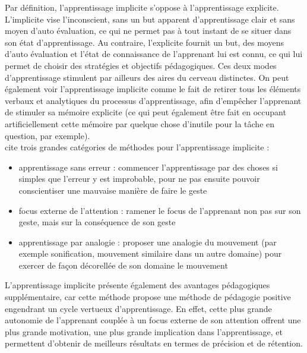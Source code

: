 Par définition, l'apprentissage implicite s'oppose à l'apprentissage explicite. 
L'implicite vise l'inconscient, sans un but apparent d'apprentissage clair et sans moyen d'auto évaluation, ce qui ne permet pas à tout instant de se situer dans son état d'apprentissage. 
Au contraire, l'explicite fournit un but, des moyens d'auto évaluation et l'état de connaissance de l'apprenant lui est connu, ce qui lui permet de choisir des stratégies et objectifs pédagogiques.
Ces deux modes d'apprentissage stimulent par ailleurs des aires du cerveau distinctes. \cite{ImplicitMotorLearning.Fang+}
On peut également voir l'apprentissage implicite comme le fait de retirer tous les éléments verbaux et analytiques du processus d'apprentissage, afin d'empêcher l'apprenant de stimuler sa mémoire explicite \cite{SoYouLearnImplicitly.Poolton+}
(ce qui peut également être fait en occupant artificiellement cette mémoire par quelque chose d'inutile pour la tâche en question, par exemple). \\

\cite{SoYouLearnImplicitly.Poolton+} cite trois grandes catégories de méthodes pour l'apprentissage implicite : 
\begin{itemize}
    \item apprentissage sans erreur : commencer l'apprentissage par des choses si simples que l'erreur y est improbable, pour ne pas ensuite pouvoir conscientiser une mauvaise manière de faire le geste
    \item focus externe de l'attention : ramener le focus de l'apprenant non pas sur son geste, mais sur la conséquence de son geste
    \item apprentissage par analogie : proposer une analogie du mouvement (par exemple sonification, mouvement similaire dans un autre domaine) pour exercer de façon décorellée de son domaine le mouvement \\
\end{itemize} 

L'apprentissage implicite présente également des avantages pédagogiques supplémentaire, car cette méthode propose une méthode de pédagogie positive engendrant un cycle vertueux d'apprentissage. 
En effet, cette plus grande autonomie de l'apprenant couplée à un focus externe de son attention offrent une plus grande motivation, une plus grande implication dans l'apprentissage, et permettent d'obtenir de meilleurs résultats en termes de précision et de rétention. \cite{OPTIMAL.Wulf+} 

